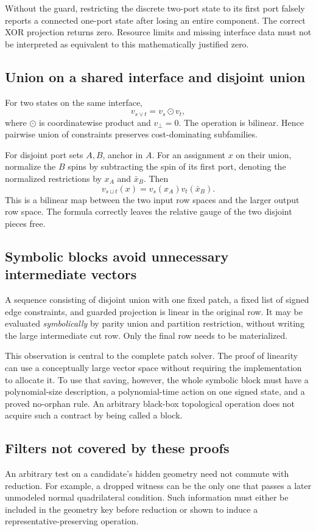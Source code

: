 \documentclass[11pt,letterpaper]{article}
\theoremstyle{definition}
\newcommand{\bad}{\bot}
\begin{document}
Without the guard, restricting the discrete two-port state to its first port falsely reports a connected one-port state after losing an entire component. The correct XOR projection returns zero. Resource limits and missing interface data must not be interpreted as equivalent to this mathematically justified zero.

\subsection{Union on a shared interface and disjoint union}
For two states on the same interface,
\[
 v_{s\vee t}=v_s\odot v_t,
\]
where $\odot$ is coordinatewise product and $v_{\bad}=0$. The operation is bilinear. Hence pairwise union of constraints preserves cost-dominating subfamilies.

For disjoint port sets $A,B$, anchor in $A$. For an assignment $x$ on their union, normalize the $B$ spins by subtracting the spin of its first port, denoting the normalized restrictions by $x_A$ and $\bar x_B$. Then
\begin{equation}\label{eq:disjoint-map}
 v_{s\sqcup t}(x)=v_s(x_A)v_t(\bar x_B).
\end{equation}
This is a bilinear map between the two input row spaces and the larger output row space. The formula correctly leaves the relative gauge of the two disjoint pieces free.

\subsection{Symbolic blocks avoid unnecessary intermediate vectors}
A sequence consisting of disjoint union with one fixed patch, a fixed list of signed edge constraints, and guarded projection is linear in the original row. It may be evaluated \emph{symbolically} by parity union and partition restriction, without writing the large intermediate cut row. Only the final row needs to be materialized.

This observation is central to the complete patch solver. The proof of linearity can use a conceptually large vector space without requiring the implementation to allocate it. To use that saving, however, the whole symbolic block must have a polynomial-size description, a polynomial-time action on one signed state, and a proved no-orphan rule. An arbitrary black-box topological operation does not acquire such a contract by being called a block.

\subsection{Filters not covered by these proofs}
An arbitrary test on a candidate's hidden geometry need not commute with reduction. For example, a dropped witness can be the only one that passes a later unmodeled normal quadrilateral condition. Such information must either be included in the geometry key before reduction or shown to induce a representative-preserving operation.
\end{document}
